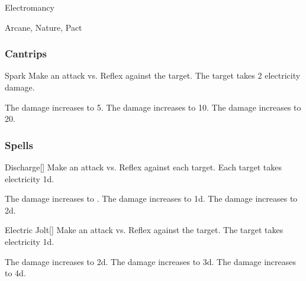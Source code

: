 \newpage
\begin{spellsection}{Electromancy}

\begin{spellheader}
\end{spellheader}


 Arcane, Nature, Pact

\subsubsection{Cantrips}


\begin{freeability}{Spark}
Make an attack vs. Reflex against the target.
\hit The target takes 2 electricity damage.

\rankline
{} The damage increases to 5.
 The damage increases to 10.
 The damage increases to 20.
\end{freeability}

\end{spellsection}


\subsubsection{Spells}


\lowercase{\hypertarget{spell:Discharge}{}}\label{spell:Discharge}
\begin{freeability}[Rank 1]{\hypertarget{spell:Discharge}{Discharge}}[]
Make an attack vs. Reflex against each target.
\hit Each target takes electricity  \minus1d.

\rankline
{} The damage increases to .
 The damage increases to  \plus1d.
 The damage increases to  \plus2d.
\end{freeability}
\vspace{0.25em}



\lowercase{\hypertarget{spell:Electric Jolt}{}}\label{spell:Electric Jolt}
\begin{freeability}[Rank 1]{\hypertarget{spell:Electric Jolt}{Electric Jolt}}[]
Make an attack vs. Reflex against the target.
\hit The target takes electricity  \plus1d.

\rankline
{} The damage increases to  \plus2d.
 The damage increases to  \plus3d.
 The damage increases to  \plus4d.
\end{freeability}
\vspace{0.25em}



